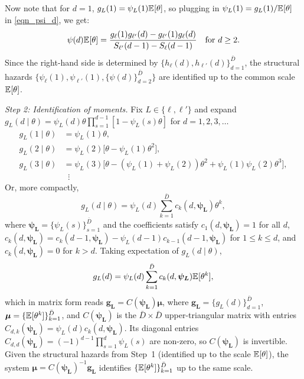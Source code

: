 \documentclass{div}
\begin{document}
Now note that for $d = 1$, $g_L(1) = \psi_L(1)\E[\theta]$, so plugging in $\psi_L(1)=g_L(1)/\E[\theta]$ in \eqref{eqn_psi_d}, we get:
\[
\psi(d)\E[\theta] = \frac{g_\ell(1)g_{\ell'}(d) - g_{\ell'}(1)g_\ell(d)}{S_{\ell'}(d-1) - S_\ell(d-1)} \quad \text{for } d \geq 2.
\]
Since the right-hand side is determined by $\{h_\ell(d), h_{\ell'}(d)\}_{d=1}^{\bar{D}}$, the structural hazards $\{\psi_\ell(1), \psi_{\ell'}(1), \{\psi(d)\}_{d=2}^{\bar{D}}\}$ are identified up to the common scale $\E[\theta]$.

\noindent \textit{Step 2: Identification of moments.} Fix $L \in \{\ell, \ell'\}$ and expand $g_L(d \mid \theta) = \psi_L(d)\theta\prod_{s=1}^{d-1}[1-\psi_L(s)\theta]$ for $d=1, 2, 3, \hdots$
\begin{align*}
g_L(1 \mid \theta) &= \psi_L(1)\theta, \\
g_L(2 \mid \theta) &= \psi_L(2)\big[\theta - \psi_L(1)\theta^2\big], \\
g_L(3 \mid \theta) &= \psi_L(3)\big[\theta - (\psi_L(1)+\psi_L(2))\theta^2 + \psi_L(1)\psi_L(2)\theta^3\big], \\
&\;\;\vdots
\end{align*}
Or, more compactly,
\begin{equation}\label{eqn_compact_moments}
g_L(d \mid \theta) = \psi_L(d)\sum_{k=1}^{\bar{D}} c_k(d, \bm{\psi_L})\theta^k,
\end{equation}
where $\bm{\psi_L} = \{\psi_L(s)\}_{s=1}^{\bar{D}}$ and the coefficients satisfy $c_1(d, \bm{\psi_L}) = 1$ for all $d$, $c_k(d, \bm{\psi_L}) = c_k(d-1, \bm{\psi_L}) - \psi_L(d-1)c_{k-1}(d-1, \bm{\psi_L})$ for $1 \leq k \leq d$, and $c_k(d, \bm{\psi_L}) = 0$ for $k > d$. Taking expectation of $g_L(d \mid \theta)$,
\[
g_L(d) = \psi_L(d)\sum_{k=1}^{\bar{D}} c_k(d, \bm{\psi_L})\E[\theta^k],
\]
which in matrix form reads $\bm{g_L} = C(\bm{\psi_L})\bm{\mu}$, where $\bm{g_L} = \{g_L(d)\}_{d=1}^{\bar{D}}$, $\bm{\mu} = \{\E[\theta^k]\}_{k=1}^{\bar{D}}$, and $C(\bm{\psi_L})$ is the $\bar{D}\times\bar{D}$ upper-triangular matrix with entries $C_{d,k}(\bm{\psi_L}) = \psi_L(d)c_k(d, \bm{\psi_L})$. Its diagonal entries $C_{d,d}(\bm{\psi_L}) = (-1)^{d-1}\prod_{s=1}^{d} \psi_L(s)$ are non-zero, so $C(\bm{\psi_L})$ is invertible. Given the structural hazards from Step~1 (identified up to the scale $\E[\theta]$), the system $\bm{\mu} = C(\bm{\psi_L})^{-1}\bm{g_L}$ identifies $\{\E[\theta^k]\}_{k=1}^{\bar{D}}$ up to the same scale.

\end{document}
